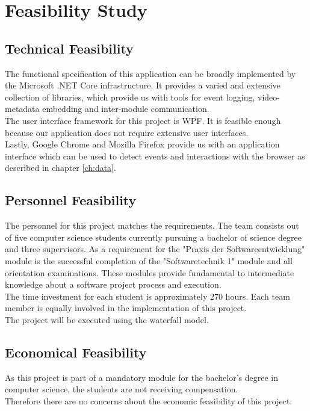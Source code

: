 \chapter{Feasibility Study}
\label{ch:feasibility}

\section{Technical Feasibility}
\label{Technical Feasibility}
The functional specification of this application can be broadly implemented by the Microsoft .NET Core infrastructure. It provides a varied and extensive collection of libraries, which provide us with tools for \gls{event} logging, video-metadata embedding and inter-module communication.\\
The user interface framework for this project is WPF. It is feasible enough because our application does not require extensive user interfaces.\\
Lastly, Google Chrome and Mozilla Firefox provide us with an application interface which can be used to detect \glspl{event} and interactions with the \gls{browser} as described in chapter \ref{ch:data}.

\section{Personnel Feasibility}
\label{Personnel Feasibility}
The personnel for this project matches the requirements. The team consists out of five computer science students currently pursuing a bachelor of science degree and three supervisors. As a requirement for the "Praxis der Softwareentwicklung" module is the successful completion of the "Softwaretechnik 1" module and all orientation examinations. These modules provide fundamental to intermediate knowledge about a software project process and execution.\\
The time investment for each student is approximately 270 hours. Each team member is equally involved in the implementation of this project.\\
The project will be executed using the waterfall model.

\section{Economical Feasibility}
\label{Economical Feasibility}
As this project is part of a mandatory module for the bachelor's degree in computer science, the students are not receiving compensation.\\
Therefore there are no concerns about the economic feasibility of this project.

